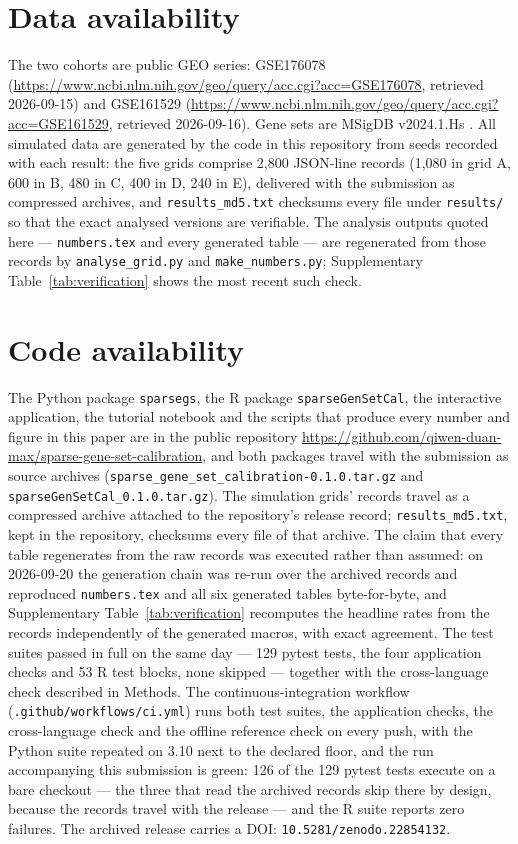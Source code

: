 \documentclass[11pt]{article}
\newcommand{\code}[1]{\texttt{#1}}
\begin{document}
\section*{Data availability}
The two cohorts are public GEO series: GSE176078 \citep{wu2021}
(\url{https://www.ncbi.nlm.nih.gov/geo/query/acc.cgi?acc=GSE176078},
retrieved 2026-09-15) and GSE161529 \citep{pal2021}
(\url{https://www.ncbi.nlm.nih.gov/geo/query/acc.cgi?acc=GSE161529},
retrieved 2026-09-16). Gene sets are MSigDB v2024.1.Hs
\citep{liberzon2015}. All simulated data are generated by the code in this
repository from seeds recorded with each result: the five grids comprise
2{,}800 JSON-line records (1{,}080 in grid A, 600 in B, 480 in C, 400 in D,
240 in E), delivered with the submission as compressed archives, and
\code{results\_md5.txt} checksums every file under \code{results/} so that
the exact analysed versions are verifiable. The analysis outputs quoted here
--- \code{numbers.tex} and every generated table --- are regenerated from
those records by \code{analyse\_grid.py} and \code{make\_numbers.py};
Supplementary Table~\ref{tab:verification} shows the most recent such check.

\section*{Code availability}
The Python package \code{sparsegs}, the R package \code{sparseGenSetCal}, the
interactive application, the tutorial notebook and the scripts that produce
every number and figure in this paper are in the public repository
\url{https://github.com/qiwen-duan-max/sparse-gene-set-calibration}, and both
packages travel with the submission as source archives
(\code{sparse\_gene\_set\_calibration-0.1.0.tar.gz} and
\code{sparseGenSetCal\_0.1.0.tar.gz}). The simulation grids' records travel
as a compressed archive attached to the repository's release record;
\code{results\_md5.txt}, kept in the repository, checksums every file of that
archive. The claim that every table regenerates
from the raw records was executed rather than assumed: on 2026-09-20 the
generation chain was re-run over the archived records and reproduced
\code{numbers.tex} and all six generated tables byte-for-byte, and
Supplementary Table~\ref{tab:verification} recomputes the headline rates
from the records independently of the generated macros, with exact
agreement. The test suites passed in full on the same day --- 129 pytest
tests, the four application checks and 53 R test blocks, none skipped ---
together with the cross-language check described in Methods. The
continuous-integration workflow (\code{.github/workflows/ci.yml}) runs both
test suites, the application checks, the cross-language check and the offline
reference check on every push, with the Python suite repeated on 3.10 next to
the declared floor, and the run accompanying this submission is green: 126 of
the 129 pytest tests execute on a bare checkout --- the three that read the
archived records skip there by design, because the records travel with the
release --- and the R suite reports zero failures. The archived release
carries a DOI: \code{10.5281/zenodo.22854132}.
\end{document}
